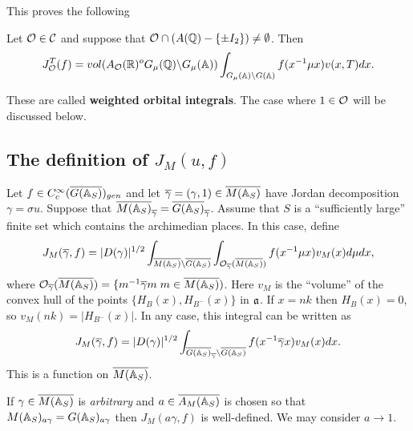 This proves the following

\begin{theorem}
Let ${\cal{O}}\in \mathcal{C}$ and suppose that
${\cal{O}}\cap (A({\Bbb{Q}})-\{\pm I_2\})\not=\emptyset $.
Then 
\[
J_{\cal{O}}^T(f)
=vol(A_{\cal{O}}({\Bbb{R}})^oG_\mu ({\Bbb{Q}})\backslash G_\mu ({\Bbb{A}}))
\int_{G_\mu ({\Bbb{A}})\backslash G({\Bbb{A}})}f(x^{-1}\mu x)v(x,T)dx. 
\]
\end{theorem}

These are called \textbf{weighted orbital integrals}.
The case where $1\in {\cal{O}}$ will be discussed below.

\subsection{The definition of $J_M(u,f)$}

Let $f\in C_c^\infty (\overline{G({\Bbb {A}}_S)})_{gen}$ and let
$\overline{\gamma}=(\gamma,1) \in \overline{M({\Bbb {A}}_S)}$
have Jordan decomposition
$\gamma =\sigma u$. Suppose that
$\overline{M({\Bbb{A}}_S)}_{\overline{\gamma}}
=\overline{G({\Bbb{A}}_S)}_{\overline{\gamma}} $.
Assume that $S$ is a ``sufficiently large'' finite set which contains
the archimedian places. In this case, define 
\begin{equation}
J_M(\overline{\gamma} ,f)=|D(\gamma )|^{1/2}
\int_{\overline{M({\Bbb {A}}_S)}
\backslash \overline{G({\Bbb {A}}_S)}}
\int_{{\cal O}_{\overline{\gamma}} (\overline{M({\Bbb {A}}_S)})}
f(x^{-1}\mu x)v_M(x)d\mu dx,
\end{equation}
where ${\cal O}_{\overline{\gamma}} (\overline{M({\Bbb {A}}_S)})
=\{m^{-1}\overline{\gamma} m\;m\in \overline{M({\Bbb {A}}_S)})$.
Here $v_M$ is the ``volume'' of the convex hull of the points
$\{H_B(x),H_{B^{-}}(x)\}$ in ${\frak a}$. If $x=nk$ then
$H_B(x)=0$, so $v_M(nk)=|H_{B^{-}}(x)|$.
In any case, this integral can be written as 
\[
J_M(\overline{\gamma} ,f)=|D(\gamma )|^{1/2}
\int_{\overline{G({\Bbb {A}}_S)}_{\overline{\gamma}}
\backslash \overline{G({\Bbb{A}}_S)}}
f(x^{-1}\overline{\gamma} x)v_M(x)dx. 
\]
This is a function on $\overline{M({\Bbb {A}}_S)}$.

If $\gamma \in \overline{M({\Bbb {A}}_S)}$
is {\em arbitrary} and $a\in \overline{A_M({\Bbb {A}}_S)}$ is
chosen so that
$M({\Bbb {A}}_S)_{a\gamma }=G({\Bbb {A}}_S)_{a\gamma }$
then $J_M(a\gamma ,f)$ is well-defined. We may consider
$a\rightarrow 1$.

